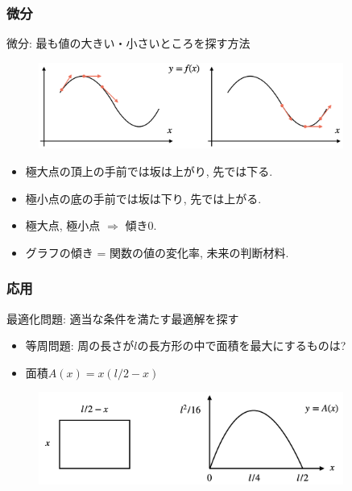 \begin{frame}
\frametitle{微分}

微分: 最も値の大きい・小さいところを探す方法

 \begin{figure}[htbp]
 \begin{center} 
  \includegraphics[width=100mm]{calculus1/diff.png}
 \end{center}
\end{figure}


\begin{itemize}
\item 極大点の頂上の手前では坂は上がり, 先では下る. 
\item 極小点の底の手前では坂は下り, 先では上がる. 
\item 極大点, 極小点 $\Rightarrow$ 傾き0. 
\item グラフの傾き = 関数の値の変化率, 未来の判断材料. 
\end{itemize}

\end{frame}




\begin{frame}
\frametitle{応用}   

最適化問題: 適当な条件を満たす最適解を探す

\begin{itemize}
\item 等周問題: 周の長さが$l$の長方形の中で面積を最大にするものは? 
\item 面積$A(x)=x(l/2-x)$
\end{itemize}

 \begin{figure}[htbp]
 \begin{center} 
  \includegraphics[width=100mm]{calculus1/LecArea.png}
 \end{center}
\end{figure}

\end{frame}


